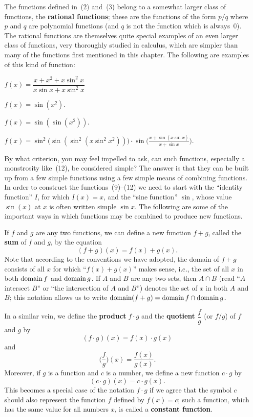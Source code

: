 The functions defined in~(2) and~(3) belong to a somewhat larger class of
functions, the \textbf{rational functions}; these are the functions of the form
$p/q$ where $p$ and $q$ are polynomial functions (and $q$ is not the function
which is always~$0$). The rational functions are themselves quite special
examples of an even larger class of functions, very thoroughly studied in
calculus, which are simpler than many of the functions first mentioned in this
chapter. The following are examples of this kind of function:
\begin{steps}[start=9]
\item $f(x) = \dfrac{x + x^2 + x\sin^2 x}{x\sin x + x\sin^2 x}$
\item $f(x) = \sin(x^2)$.
\item $f(x) = \sin(\sin(x^2))$.
\item $\displaystyle
f(x) = \sin^2\bigl(\sin(\sin^2(x\sin^2 x^2))\bigr)
\cdot \sin\Biggl(\frac{x + \sin(x\sin x)}{x + \sin x}\Biggr).$
\end{steps}

By what criterion, you may feel impelled to ask, can such functions,
especially a monstrosity like~(12), be considered simple? The answer is that
they can be built up from a few simple functions using a few simple means of
combining functions. In order to construct the functions~(9)--(12) we need to
start with the ``identity function'' $I$, for which $I(x) = x$, and the ``sine
function'' $\sin$, whose value $\sin(x)$ at $x$ is often written simple
$\sin x$. The following are some of the important ways in which functions may
be combined to produce new functions.

If $f$ and $g$ are any two functions, we can define a new function $f+g$,
called the \textbf{sum} of $f$ and $g$, by the equation
\[
(f+g)(x) = f(x) + g(x).
\]
Note that according to the conventions we have adopted, the domain of $f+g$
consists of all $x$ for which ``$f(x)+g(x)$'' makes sense, i.e., the set of all
$x$ in both $\operatorname{domain} f$ and $\operatorname{domain} g$. If $A$ and $B$ are any two sets, then
$A \cap B$ (read ``$A$ intersect $B$'' or ``the intersection of $A$ and $B$'')
denotes the set of $x$ in both $A$ and $B$; this notation allows us to write
$\operatorname{domain}(f+g) = \operatorname{domain} f \cap \operatorname{domain} g$.

In a similar vein, we define the \textbf{product} $f \cdot g$ and the
\textbf{quotient} $\dfrac{f}{g}$ (or $f/g$) of $f$ and $g$ by
\[
(f \cdot g)(x) = f(x) \cdot g(x)
\]
and
\[
\Biggl(\frac{f}{g}\Biggr)(x) = \frac{f(x)}{g(x)}.
\]
Moreover, if $g$ is a function and $c$ is a number, we define a new function
$c \cdot g$ by
\[
(c \cdot g)(x) = c \cdot g(x).
\]
This becomes a special case of the notation $f \cdot g$ if we agree that the
symbol $c$ should also represent the function $f$ defined by $f(x) = c$; such
a function, which has the same value for all numbers $x$, is called a
\textbf{constant function}.

